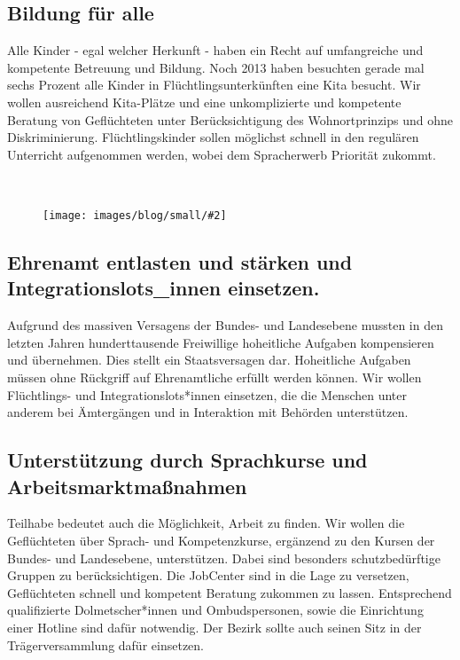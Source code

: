 \documentclass[a4paper,10pt]{article}
\newcommand{\mysection}[1]{{\vspace{1cm}\noindent\color{gray}{\ttfamily\LARGE\raggedright #1}\\\medskip}}
\newcommand{\abschnitt}[2]{%
\mysection{\raggedright #1}%
\begin{figure}[t]%
\vspace*{-2.7cm}%
\hspace*{-2.1cm}%
\texttt{[image: images/blog/small/\#2]} %
\end{figure}%
}
\begin{document}
\subsection*{\ttfamily Bildung für alle}\label{bildung-fuxfcr-alle}

Alle Kinder - egal welcher Herkunft - haben ein Recht auf umfangreiche
und kompetente Betreuung und Bildung. Noch 2013 haben besuchten gerade
mal sechs Prozent alle Kinder in Flüchtlingsunterkünften eine Kita
besucht. Wir wollen ausreichend Kita-Plätze und eine unkomplizierte und
kompetente Beratung von Geflüchteten unter Berücksichtigung des
Wohnortprinzips und ohne Diskriminierung. Flüchtlingskinder sollen
möglichst schnell in den regulären Unterricht aufgenommen werden, wobei
dem Spracherwerb Priorität zukommt.

\clearpage
\abschnitt{}{racistyouare.png}
\subsection*{\ttfamily Ehrenamt entlasten und stärken und Integrationslots\_innen
einsetzen.}\label{ehrenamt-entlasten-und-stuxe4rken-und-integrationslotsinnen-einsetzen.}

Aufgrund des massiven Versagens der Bundes- und Landesebene mussten in
den letzten Jahren hunderttausende Freiwillige hoheitliche Aufgaben
kompensieren und übernehmen. Dies stellt ein Staatsversagen dar.
Hoheitliche Aufgaben müssen ohne Rückgriff auf Ehrenamtliche erfüllt
werden können. Wir wollen Flüchtlings- und Integrationslots*innen
einsetzen, die die Menschen unter anderem bei Ämtergängen und in
Interaktion mit Behörden unterstützen.

\subsection*{\ttfamily Unterstützung durch Sprachkurse und
Arbeitsmarktmaßnahmen}\label{unterstuxfctzung-durch-sprachkurse-und-arbeitsmarktmauxdfnahmen}

Teilhabe bedeutet auch die Möglichkeit, Arbeit zu finden. Wir wollen die
Geflüchteten über Sprach- und Kompetenzkurse, ergänzend zu den Kursen
der Bundes- und Landesebene, unterstützen. Dabei sind besonders
schutzbedürftige Gruppen zu berücksichtigen. Die JobCenter sind in die
Lage zu versetzen, Geflüchteten schnell und kompetent Beratung zukommen
zu lassen. Entsprechend qualifizierte Dolmetscher*innen und
Ombudspersonen, sowie die Einrichtung einer Hotline sind dafür
notwendig. Der Bezirk sollte auch seinen Sitz in der Trägerversammlung
dafür einsetzen.
\end{document}
